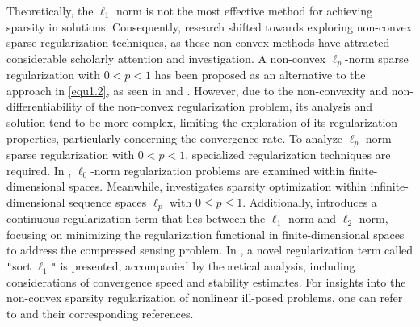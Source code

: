\documentclass[a4paper,12pt]{article}
\numberwithin{equation}{section}
\begin{document}
\par Theoretically, the $\ell_{1}$ norm is not the most effective method for achieving sparsity in solutions. Consequently, research shifted towards exploring non-convex sparse regularization techniques, as these non-convex methods have attracted considerable scholarly attention and investigation. A non-convex $\ell_{p}$-norm sparse regularization with $0<p<1$ has been proposed as an alternative to the approach in \eqref{equ1.2}, as seen in \cite{BL09} and \cite{G10}. However, due to the non-convexity and non-differentiability of the non-convex regularization problem, its analysis and solution tend to be more complex, limiting the exploration of its regularization properties, particularly concerning the convergence rate. To analyze $\ell_{p}$-norm sparse regularization with $0<p<1$, specialized regularization techniques are required. In \cite{N13}, $\ell_{0}$-norm regularization problems are examined within finite-dimensional spaces. Meanwhile,  \cite{IK14} investigates sparsity optimization within infinite-dimensional sequence spaces $\ell_{p}$ with $0\leq p\leq 1$. Additionally, \cite{YLHX15} introduces a continuous regularization term that lies between the $\ell_{1}$-norm and $\ell_{2}$-norm, focusing on minimizing the regularization functional in finite-dimensional spaces to address the compressed sensing problem. In \cite{HM10}, a novel regularization term called \verb+"+sort $\ell_{1}$\verb+"+ is presented, accompanied by theoretical analysis, including considerations of convergence speed and stability estimates. For insights into the non-convex sparsity regularization of nonlinear ill-posed problems, one can refer to \cite{RZ12,Z09} and their corresponding references.
\end{document}
